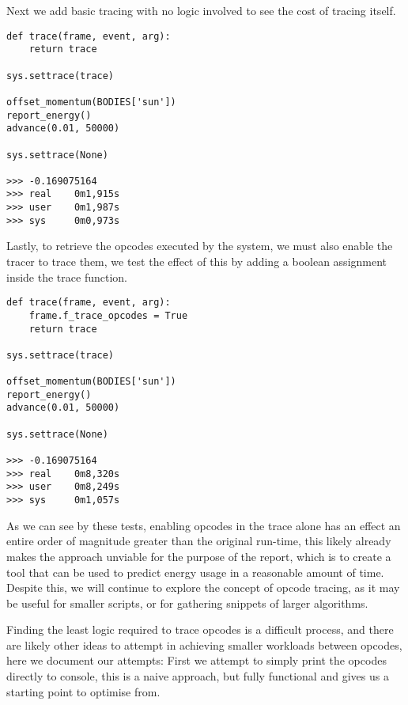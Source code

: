 Next we add basic tracing with no logic involved to see the cost of tracing itself.

\begin{lstlisting}[caption={Tracing the nbody problem with no trace logic},captionpos=b,label={lst:nbody-trace-min}]
def trace(frame, event, arg):
    return trace

sys.settrace(trace)

offset_momentum(BODIES['sun'])
report_energy()
advance(0.01, 50000)

sys.settrace(None)

>>> -0.169075164
>>> real    0m1,915s
>>> user    0m1,987s
>>> sys     0m0,973s
\end{lstlisting}

Lastly, to retrieve the opcodes executed by the system, we must also enable the tracer to trace them, we test the effect
of this by adding a boolean assignment inside the trace function.

\begin{lstlisting}[caption={Tracing the nbody problem with opcodes enabled},captionpos=b,label={lst:nbody-trace-opc}]
def trace(frame, event, arg):
    frame.f_trace_opcodes = True
    return trace

sys.settrace(trace)

offset_momentum(BODIES['sun'])
report_energy()
advance(0.01, 50000)

sys.settrace(None)

>>> -0.169075164
>>> real    0m8,320s
>>> user    0m8,249s
>>> sys     0m1,057s
\end{lstlisting}

As we can see by these tests, enabling opcodes in the trace alone has an effect an entire order of magnitude greater
than the original run-time, this likely already makes the approach unviable for the purpose of the report, which is to
create a tool that can be used to predict energy usage in a reasonable amount of time.
Despite this, we will continue to explore the concept of opcode tracing, as it may be useful for smaller scripts, or for
gathering snippets of larger algorithms.

Finding the least logic required to trace opcodes is a difficult process, and there are likely other ideas to attempt in
achieving smaller workloads between opcodes, here we document our attempts:
First we attempt to simply print the opcodes directly to console, this is a naive approach, but fully functional and
gives us a starting point to optimise from.

